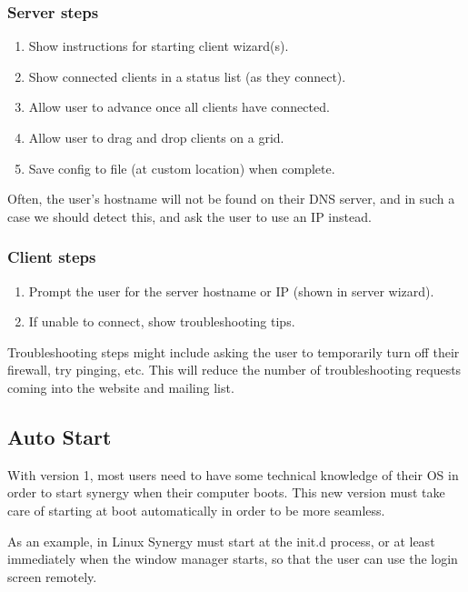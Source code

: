
\subsubsection{Server steps}
\begin{enumerate}
  \item Show instructions for starting client wizard(s).
  \item Show connected clients in a status list (as they connect).
  \item Allow user to advance once all clients have connected.
  \item Allow user to drag and drop clients on a grid.
  \item Save config to file (at custom location) when complete.
\end{enumerate}

Often, the user's hostname will not be found on their DNS server, and in such
a case we should detect this, and ask the user to use an IP instead.

\subsubsection{Client steps}
\begin{enumerate}
  \item Prompt the user for the server hostname or IP (shown in server wizard).
  \item If unable to connect, show troubleshooting tips.
\end{enumerate}

Troubleshooting steps might include asking the user to temporarily turn off
their firewall, try pinging, etc. This will reduce the number of troubleshooting
requests coming into the website and mailing list.

\subsection{Auto Start}

With version 1, most users need to have some technical knowledge of their OS
in order to start synergy when their computer boots. This new version must
take care of starting at boot automatically in order to be more seamless.

As an example, in Linux Synergy 
must start at the init.d process, or at least immediately when the window 
manager starts, so that the user can use the login screen remotely.

